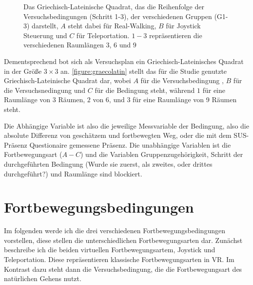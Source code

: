     \begin{figure}[!h]
        \centering
        

        \caption{Das Griechisch-Lateinische Quadrat, das die Reihenfolge der Versuchsbedingungen (Schritt 1-3), der verschiedenen Gruppen (G1-3) darstellt, $A$ steht dabei für Real-Walking, $B$ für Joystick Steuerung und $C$ für Teleportation. $1-3$ repräsentieren die verschiedenen Raumlängen $3$, $6$ und $9$}\label{figure:graecolatin}
    \end{figure}

    Dementsprechend bot sich als Versuchsplan ein Griechisch-Lateinisches Quadrat in der Größe $3 \times 3$ an. \autoref{figure:graecolatin} stellt das für die Studie genutzte Griechisch-Lateinische Quadrat dar, wobei $A$ für die Versuchsbedingung , $B$ für die Versuchsnedingung  und $C$ für die Bedingung  steht, während $1$ für eine Raumlänge von 3 Räumen, $2$ von 6, und $3$ für eine Raumlänge von 9 Räumen steht.

    Die Abhängige Variable ist also die jeweilige Messvariable der Bedingung, also die absolute Differenz von geschätzem und fortbewegten Weg, oder die mit dem SUS-Präsenz Questionaire gemessene Präsenz. Die unabhängige Variablen ist die Fortbewegungsart ($A-C$) und die Variablen Gruppenzugehörigkeit, Schritt der durchgeführten Bedingung (Wurde sie zuerst, als zweites, oder drittes durchgeführt?) und Raumlänge sind blockiert. %

    \section{Fortbewegungsbedingungen}\label{sec:conditions}
        Im folgenden werde ich die drei verschiedenen Fortbewegungsbedingungen vorstellen, diese stellen die unterschiedlichen Fortbewegungsarten dar. Zunächst beschreibe ich die beiden virtuellen Fortbewegungsartem, Joystick und Teleportation. Diese repräsentieren klassische Fortbewegungsarten in VR. Im Kontrast dazu steht dann die Versuchsbedingung, die die Fortbewegungsart des natürlichen Gehens nutzt.

